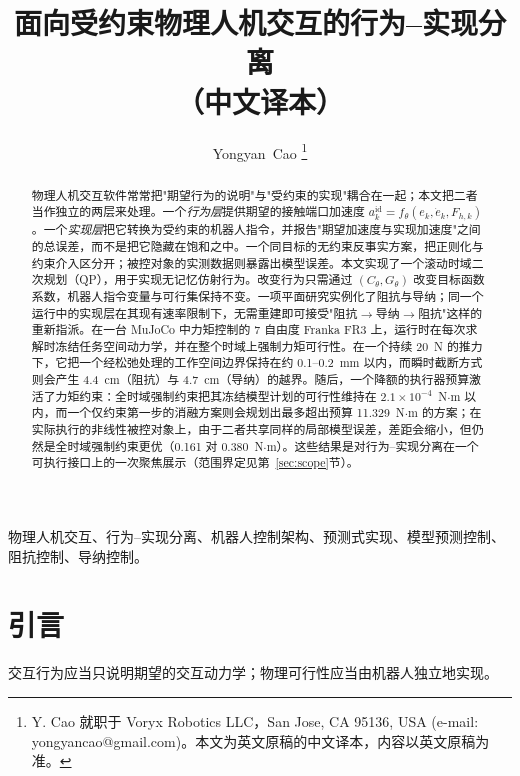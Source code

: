 \documentclass[journal]{IEEEtran}
\begin{document}
\title{面向受约束物理人机交互的行为--实现分离\\[2pt]\large（中文译本）}

\author{Yongyan~Cao%
\thanks{Y. Cao 就职于 Voryx Robotics LLC，San Jose, CA 95136, USA
(e-mail: yongyancao@gmail.com)。本文为英文原稿的中文译本，内容以英文原稿为准。}}

\maketitle

\begin{abstract}
物理人机交互软件常常把"期望行为的说明"与"受约束的实现"耦合在一起；本文把二者当作独立的两层来处理。一个\emph{行为层}提供期望的接触端口加速度 $a_k^{\mathrm{id}}=f_\theta(e_k,\dot e_k,F_{h,k})$。一个\emph{实现层}把它转换为受约束的机器人指令，并报告"期望加速度与实现加速度"之间的总误差，而不是把它隐藏在饱和之中。一个同目标的无约束反事实方案，把正则化与约束介入区分开；被控对象的实测数据则暴露出模型误差。本文实现了一个滚动时域二次规划（QP），用于实现无记忆仿射行为。改变行为只需通过 $(C_\theta,G_\theta)$ 改变目标函数系数，机器人指令变量与可行集保持不变。一项平面研究实例化了阻抗与导纳；同一个运行中的实现层在其现有速率限制下，无需重建即可接受"阻抗$\to$导纳$\to$阻抗"这样的重新指派。在一台 MuJoCo 中力矩控制的 7 自由度 Franka FR3 上，运行时在每次求解时冻结任务空间动力学，并在整个时域上强制力矩可行性。在一个持续 20~N 的推力下，它把一个经松弛处理的工作空间边界保持在约 0.1--0.2~mm 以内，而瞬时截断方式则会产生 4.4~cm（阻抗）与 4.7~cm（导纳）的越界。随后，一个降额的执行器预算激活了力矩约束：全时域强制约束把其冻结模型计划的可行性维持在 $2.1\times10^{-4}$~N$\cdot$m 以内，而一个仅约束第一步的消融方案则会规划出最多超出预算 11.329~N$\cdot$m 的方案；在实际执行的非线性被控对象上，由于二者共享同样的局部模型误差，差距会缩小，但仍然是全时域强制约束更优（0.161 对 0.380~N$\cdot$m）。这些结果是对行为--实现分离在一个可执行接口上的一次聚焦展示（范围界定见第~\ref{sec:scope}节）。
\end{abstract}

\begin{IEEEkeywords}
物理人机交互、行为--实现分离、机器人控制架构、预测式实现、模型预测控制、阻抗控制、导纳控制。
\end{IEEEkeywords}

\section{引言}
\label{sec:intro}

交互行为应当只说明期望的交互动力学；物理可行性应当由机器人独立地实现。
\end{document}
